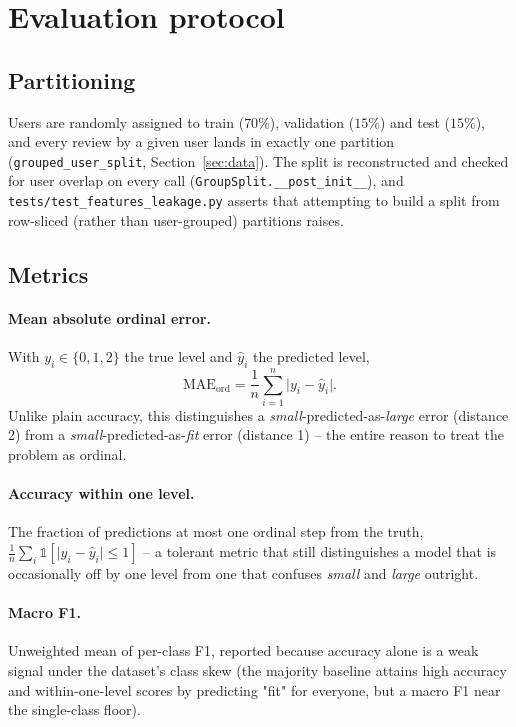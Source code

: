 \section{Evaluation protocol}
\label{sec:evaluation}

\subsection{Partitioning}

Users are randomly assigned to train ($70\%$), validation ($15\%$) and test
($15\%$), and every review by a given user lands in exactly one partition
(\texttt{grouped\_user\_split}, Section~\ref{sec:data}). The split is
reconstructed and checked for user overlap on every call
(\texttt{GroupSplit.\_\_post\_init\_\_}), and
\texttt{tests/test\_features\_leakage.py} asserts that attempting to build a
split from row-sliced (rather than user-grouped) partitions raises.

\subsection{Metrics}

\paragraph{Mean absolute ordinal error.} With $y_i \in \{0, 1, 2\}$ the true
level and $\hat{y}_i$ the predicted level,
\begin{equation}
  \text{MAE}_{\text{ord}} = \frac{1}{n} \sum_{i=1}^{n} \lvert y_i - \hat{y}_i \rvert.
\end{equation}
Unlike plain accuracy, this distinguishes a \emph{small}-predicted-as-\emph{large}
error (distance 2) from a \emph{small}-predicted-as-\emph{fit} error
(distance 1) -- the entire reason to treat the problem as ordinal.

\paragraph{Accuracy within one level.} The fraction of predictions at most
one ordinal step from the truth, $\frac{1}{n}\sum_i
\mathbb{1}[\lvert y_i - \hat{y}_i\rvert \le 1]$ -- a tolerant metric that
still distinguishes a model that is occasionally off by one level from one
that confuses \emph{small} and \emph{large} outright.

\paragraph{Macro F1.} Unweighted mean of per-class F1, reported because
accuracy alone is a weak signal under the dataset's class skew (the majority
baseline attains high accuracy and within-one-level scores by predicting
"fit" for everyone, but a macro F1 near the single-class floor).

